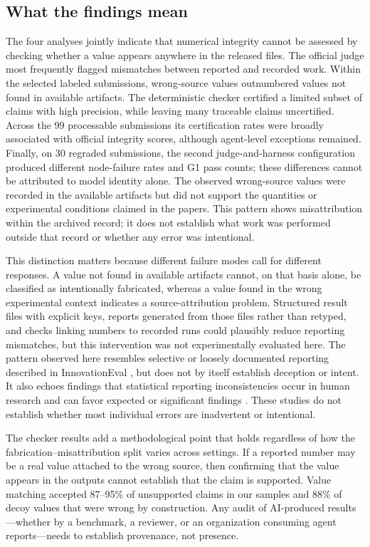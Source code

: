 \documentclass[preprint,12pt,authoryear]{elsarticle}
\begin{document}
\subsection{What the findings mean}

The four analyses jointly indicate that numerical integrity cannot be assessed by checking whether a value appears anywhere in the released files. The official judge most frequently flagged mismatches between reported and recorded work. Within the selected labeled submissions, wrong-source values outnumbered values not found in available artifacts. The deterministic checker certified a limited subset of claims with high precision, while leaving many traceable claims uncertified. Across the 99 processable submissions its certification rates were broadly associated with official integrity scores, although agent-level exceptions remained. Finally, on 30 regraded submissions, the second judge-and-harness configuration produced different node-failure rates and G1 pass counts; these differences cannot be attributed to model identity alone. The observed wrong-source values were recorded in the available artifacts but did not support the quantities or experimental conditions claimed in the papers. This pattern shows misattribution within the archived record; it does not establish what work was performed outside that record or whether any error was intentional.

This distinction matters because different failure modes call for different responses. A value not found in available artifacts cannot, on that basis alone, be classified as intentionally fabricated, whereas a value found in the wrong experimental context indicates a source-attribution problem. Structured result files with explicit keys, reports generated from those files rather than retyped, and checks linking numbers to recorded runs could plausibly reduce reporting mismatches, but this intervention was not experimentally evaluated here. The pattern observed here resembles selective or loosely documented reporting described in InnovationEval \citep{owen2026innovationeval}, but does not by itself establish deception or intent. It also echoes findings that statistical reporting inconsistencies occur in human research and can favor expected or significant findings \citep{bakker2011errors,nuijten2016statcheck}. These studies do not establish whether most individual errors are inadvertent or intentional.

The checker results add a methodological point that holds regardless of how the fabrication--misattribution split varies across settings. If a reported number may be a real value attached to the wrong source, then confirming that the value appears in the outputs cannot establish that the claim is supported. Value matching accepted 87--95\% of unsupported claims in our samples and 88\% of decoy values that were wrong by construction. Any audit of AI-produced results---whether by a benchmark, a reviewer, or an organization consuming agent reports---needs to establish provenance, not presence.
\end{document}

